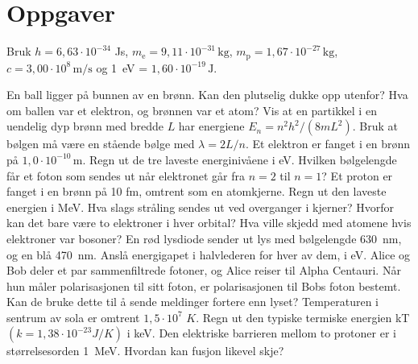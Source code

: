 \documentclass[11pt]{article}
\begin{document}

\section*{Oppgaver}

Bruk $h = 6{,}63 \cdot 10^{-34}$ Js, $m_{\mathrm{e}} = 9{,}11 \cdot 10^{-31}\,\mathrm{kg}$, $m_{\mathrm{p}} = 1{,}67 \cdot 10^{-27}\,\mathrm{kg}$, $c = 3{,}00 \cdot 10^{8}\,\mathrm{m/s}$ og 1~eV = $1{,}60 \cdot 10^{-19}\,\mathrm{J}$.

\begin{oppgaveliste}
\oppgave {}En ball ligger på bunnen av en brønn. Kan den plutselig dukke opp utenfor? Hva om ballen var et elektron, og brønnen var et atom?
\svar
\oppgave {}Vis at en partikkel i en uendelig dyp brønn med bredde $L$ har energiene $E_{n} = n^{2}h^{2}/(8mL^{2})$. Bruk at bølgen må være en stående bølge med $λ = 2L/n$.
\svar
\oppgave {}Et elektron er fanget i en brønn på $1{,}0 \cdot 10^{-10}\,\mathrm{m}$. Regn ut de tre laveste energinivåene i eV. Hvilken bølgelengde får et foton som sendes ut når elektronet går fra $n = 2$ til $n = 1$?
\svar
\oppgave {}Et proton er fanget i en brønn på 10 fm, omtrent som en atomkjerne. Regn ut den laveste energien i MeV. Hva slags stråling sendes ut ved overganger i kjerner?
\svar
\oppgave {}Hvorfor kan det bare være to elektroner i hver orbital? Hva ville skjedd med atomene hvis elektroner var bosoner?
\svar
\oppgave {}En rød lysdiode sender ut lys med bølgelengde 630~nm, og en blå 470~nm. Anslå energigapet i halvlederen for hver av dem, i eV.
\svar
\oppgave {}Alice og Bob deler et par sammenfiltrede fotoner, og Alice reiser til Alpha Centauri. Når hun måler polarisasjonen til sitt foton, er polarisasjonen til Bobs foton bestemt. Kan de bruke dette til å sende meldinger fortere enn lyset?
\svar
\oppgave {}Temperaturen i sentrum av sola er omtrent $1{,}5 \cdot 10^{7}$ $K$. Regn ut den typiske termiske energien kT $(k = 1{,}38 \cdot 10^{-23} J/K)$ i keV. Den elektriske barrieren mellom to protoner er i størrelsesorden 1~MeV. Hvordan kan fusjon likevel skje?
\svar
\end{oppgaveliste}
\end{document}
